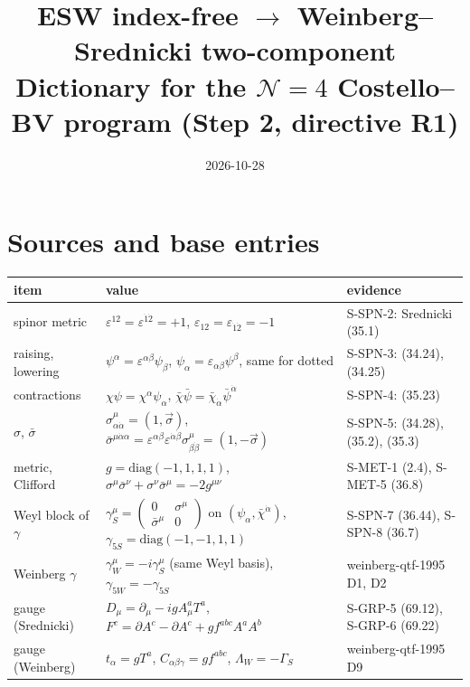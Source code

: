 \documentclass[11pt]{article}
\title{ESW index-free $\longrightarrow$ Weinberg--Srednicki two-component\\[2pt]
\large Dictionary for the $\mathcal N=4$ Costello--BV program (Step 2, directive R1)}
\author{}
\date{2026-10-28}
\theoremstyle{definition}
\begin{document}
\maketitle

\section{Sources and base entries}

\begin{center}\small
\begin{tabular}{l|l|p{4.2cm}}
item & value & evidence \\
\hline
spinor metric & $\varepsilon^{12}=\varepsilon^{\dot1\dot2}=+1$, $\varepsilon_{12}=\varepsilon_{\dot1\dot2}=-1$ & S-SPN-2: Srednicki (35.1) \\
raising, lowering & $\psi^\alpha=\varepsilon^{\alpha\beta}\psi_\beta$, $\psi_\alpha=\varepsilon_{\alpha\beta}\psi^\beta$, same for dotted & S-SPN-3: (34.24), (34.25) \\
contractions & $\chi\psi=\chi^\alpha\psi_\alpha$, $\bar\chi\bar\psi=\bar\chi_{\dot\alpha}\bar\psi^{\dot\alpha}$ & S-SPN-4: (35.23) \\
$\sigma$, $\bar\sigma$ & $\sigma^\mu_{\alpha\dot\alpha}=(1,\vec\sigma)$, $\bar\sigma^{\mu\dot\alpha\alpha}=\varepsilon^{\alpha\beta}\varepsilon^{\dot\alpha\dot\beta}\sigma^\mu_{\beta\dot\beta}=(1,-\vec\sigma)$ & S-SPN-5: (34.28), (35.2), (35.3) \\
metric, Clifford & $g=\mathrm{diag}(-1,1,1,1)$, $\sigma^\mu\bar\sigma^\nu+\sigma^\nu\bar\sigma^\mu=-2g^{\mu\nu}$ & S-MET-1 (2.4), S-MET-5 (36.8) \\
Weyl block of $\gamma$ & $\gamma_S^\mu=\begin{pmatrix}0&\sigma^\mu\\ \bar\sigma^\mu&0\end{pmatrix}$ on $(\psi_\alpha,\bar\chi^{\dot\alpha})$, $\gamma_{5S}=\mathrm{diag}(-1,-1,1,1)$ & S-SPN-7 (36.44), S-SPN-8 (36.7) \\
Weinberg $\gamma$ & $\gamma_W^\mu=-i\gamma_S^\mu$ (same Weyl basis), $\gamma_{5W}=-\gamma_{5S}$ & weinberg-qtf-1995 D1, D2 \\
gauge (Srednicki) & $D_\mu=\partial_\mu-igA^a_\mu T^a$, $F^c=\partial A^c-\partial A^c+gf^{abc}A^aA^b$ & S-GRP-5 (69.12), S-GRP-6 (69.22) \\
gauge (Weinberg) & $t_\alpha=gT^a$, $C_{\alpha\beta\gamma}=gf^{abc}$, $\Lambda_W=-\Gamma_S$ & weinberg-qtf-1995 D9 \\
\end{tabular}
\end{center}
\end{document}
